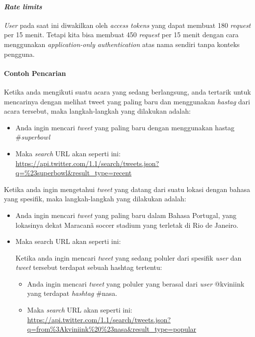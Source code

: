 \paragraph{\textit{Rate limits}}
\textit{User} pada saat ini diwakilkan oleh \textit{access tokens} yang dapat membuat 180 \textit{request} per 15 menit. Tetapi kita bisa membuat 450 \textit{request} per 15 menit dengan cara menggunakan \textit{application-only authentication} atas nama sendiri tanpa konteks pengguna.

\paragraph{Contoh Pencarian}
Ketika anda mengikuti suatu acara yang sedang berlangsung, anda tertarik untuk mencarinya dengan melihat tweet yang paling baru dan menggunakan \textit{hastag} dari acara tersebut, maka langkah-langkah yang dilakukan adalah:
\begin{itemize}
	\item Anda ingin mencari \textit{tweet} yang paling baru dengan menggunakan hastag \#\textit{superbowl}
	\item Maka \textit{search} URL akan seperti ini:
	\url{https://api.twitter.com/1.1/search/tweets.json?q=\%23superbowl\&result\_type=recent}
\end{itemize}

Ketika anda ingin mengetahui \textit{tweet} yang datang dari suatu lokasi dengan bahasa yang spesifik, maka langkah-langkah yang dilakukan adalah:
\begin{itemize}
	\item Anda ingin mencari \textit{tweet} yang paling baru dalam Bahasa Portugal, yang lokasinya dekat Maracanã soccer stadium yang terletak di Rio de Janeiro.
	\item Maka search URL akan seperti ini:
	
Ketika anda ingin mencari \textit{tweet} yang sedang poluler dari spesifik \textit{user} dan \textit{tweet} tersebut terdapat sebuah hashtag tertentu:
\begin{itemize}
	\item Anda ingin mencari \textit{tweet} yang poluler yang berasal dari \textit{user} @kviniink yang terdapat \textit{hashtag} \#nasa.
	\item Maka \textit{search} URL akan seperti ini:
	\url{https://api.twitter.com/1.1/search/tweets.json?q=from\%3Akviniink\%20\%23nasa\&result\_type=popular}
\end{itemize}
\end{itemize}

